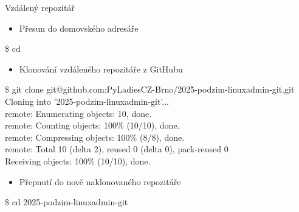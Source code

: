 \documentclass{beamer}
\newcommand{\ts}{\raisebox{-0.25em}{\textasciitilde}}
\begin{document}
	
\begin{frame}[fragile]{Vzdálený repozitář}
	
	\begin{itemize}
		\item Přesun do domovského adresáře
	\end{itemize}
	
	{\ttfamily\small
		\$ cd \ts \\
	}
	
	\hspace{0.5cm}
	\begin{itemize}
		\item Klonování vzdáleného repozitáře z GitHubu
	\end{itemize}
	
	{\ttfamily\small
		\$ git clone git@github.com:PyLadiesCZ-Brno/2025-podzim-linuxadmin-git.git \\
		Cloning into '2025-podzim-linuxadmin-git'... \\
		remote: Enumerating objects: 10, done. \\
		remote: Counting objects: 100\% (10/10), done. \\
		remote: Compressing objects: 100\% (8/8), done. \\
		remote: Total 10 (delta 2), reused 0 (delta 0), pack-reused 0 \\
		Receiving objects: 100\% (10/10), done. \\
	}
	
	\hspace{0.5cm}
	\begin{itemize}
		\item Přepnutí do nově naklonovaného repozitáře
	\end{itemize}
	
	{\ttfamily\small
		\$ cd 2025-podzim-linuxadmin-git \\
	}
	
\end{frame}
\end{document}
